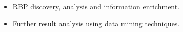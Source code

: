 \documentclass{beamer}
\begin{document}
\begin{frame}[allowframebreaks]
\begin{itemize}
\item
RBP discovery, analysis and information enrichment.\\ \vspace{0.7cm}

\item
Further result analysis using data mining techniques.

\end{itemize}


\end{frame}
\end{document}
